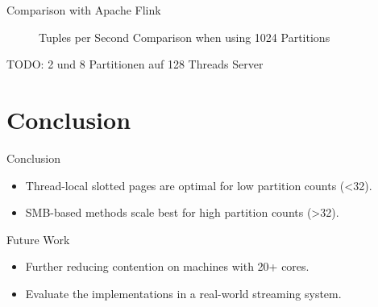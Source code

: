 \begin{frame}{Comparison with Apache Flink}
  \begin{figure}[h]
    \centering
    \resizebox{.7\linewidth}{!}{}
    \caption[Tuples per Second Comparison Plot with Apache Flink]{Tuples per Second Comparison when using 1024 Partitions}
    \label{plot-apache-flink-comparison}
  \end{figure}
\end{frame}

\begin{frame}
  {\color{red} TODO: 2 und 8 Partitionen auf 128 Threads Server}
\end{frame}

\section{Conclusion}
\begin{frame}{Conclusion}
  \begin{itemize}
    \item Thread-local slotted pages are optimal for low partition counts (<32).
    \item SMB-based methods scale best for high partition counts (>32).
  \end{itemize}

  {\PraesentationSchriftgroesseSehrGross\selectfont Future Work}
  \begin{itemize}
    \item Further reducing contention on machines with 20+ cores.
    \item Evaluate the implementations in a real-world streaming system.
  \end{itemize}

\end{frame}

